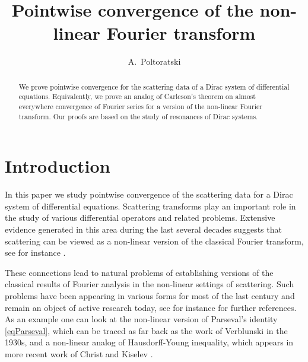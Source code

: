 \documentclass[11pt,twoside,reqno]{amsart}
\author{A.~Poltoratski}
\theoremstyle{plain}
\numberwithin{equation}{section}
\begin{document}
\begin{abstract} We prove pointwise convergence for the scattering data of a Dirac system of differential equations. Equivalently, we
prove an analog of Carleson's theorem on almost everywhere convergence of Fourier series for a version of the non-linear Fourier transform. Our proofs are based
 on the study of resonances of Dirac systems. 
\end{abstract}

\title{Pointwise convergence of  the non-linear Fourier transform}





\maketitle






\section*{Introduction}\label{secInt}

In this paper we study pointwise convergence of the scattering data for a Dirac system of differential equations. Scattering transforms
play an important role in the study of various differential operators and related problems. Extensive evidence
generated in this area during  the last several decades suggests that scattering
can be viewed as a non-linear version of the classical Fourier transform, see for instance \cite{AKNS, ZS, T, TT}.

These connections lead to natural problems of establishing versions of the classical results of Fourier analysis in the non-linear settings of scattering.
Such problems have been appearing in various forms for most of the last century and remain an object of active research today, see for instance \cite{S} for further references. As an example one can look at the non-linear version of Parseval's identity \eqref{eqParseval}, which can be traced as far back as the work of Verblunski in the 1930s, and a non-linear analog
of Hausdorff-Young inequality, which appears in more recent work of Christ and Kiselev  \cite{CK, Ch}.
\end{document}
